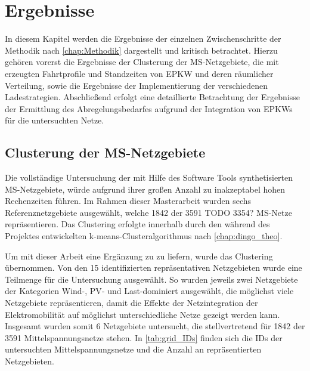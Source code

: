 
\section{Ergebnisse}

In diesem Kapitel werden die Ergebnisse der einzelnen Zwischenschritte der Methodik nach \autoref{chap:Methodik} dargestellt und kritisch betrachtet.
Hierzu gehören vorerst die Ergebnisse der Clusterung der \gls{MS}-Netzgebiete, die mit \simbev erzeugten Fahrtprofile und Standzeiten von \gls{EPKW} und deren räumlicher Verteilung, sowie die Ergebnisse der Implementierung der verschiedenen Ladestrategien.
Abschließend erfolgt eine detaillierte Betrachtung der Ergebnisse der Ermittlung des Abregelungsbedarfes aufgrund der Integration von \glspl{EPKW} für die untersuchten Netze.


\subsection{Clusterung der MS-Netzgebiete}


Die vollständige Untersuchung der mit Hilfe des Software Tools \dingo synthetisierten \gls{MS}-Netzgebiete, würde aufgrund ihrer großen Anzahl zu inakzeptabel hohen Rechenzeiten führen.
Im Rahmen dieser Masterarbeit wurden sechs Referenznetzgebiete ausgewählt, welche \num{1842} der \num{3591} {\color{red} TODO 3354?} \gls{MS}-Netze repräsentieren.
Das Clustering erfolgte innerhalb \cite{Schachler} durch den während des \openego Projektes entwickelten k-means-Clusteralgorithmus nach \autoref{chap:dingo_theo}.\medskip

Um mit dieser Arbeit eine Ergänzung zu \cite{Schachler} zu liefern, wurde das Clustering übernommen.
Von den \num{15} identifizierten repräsentativen Netzgebieten wurde eine Teilmenge für die Untersuchung ausgewählt.
So wurden jeweils zwei Netzgebiete der Kategorien Wind-, \gls{PV}- und Last-dominiert ausgewählt, die möglichst viele Netzgebiete repräsentieren, damit die Effekte der Netzintegration der Elektromobilität auf möglichst unterschiedliche Netze gezeigt werden kann.
Insgesamt wurden somit \num{6} Netzgebiete untersucht, die stellvertretend für \num{1842} der \num{3591} Mittelspannungsnetze stehen.
In \autoref{tab:grid_IDs} finden sich die \glspl{ID} der untersuchten Mittelspannungsnetze und die Anzahl an repräsentierten Netzgebieten.




